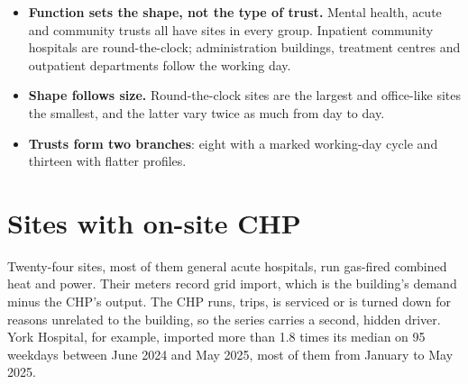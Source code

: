 \documentclass[10pt,a4paper]{article}
\newcommand{\tablefont}{\small\renewcommand{\arraystretch}{1.08}}
\newenvironment{figblock}{\par\medskip\noindent\begin{minipage}{\textwidth}}{\end{minipage}\par\medskip}
\begin{document}
\begin{itemize}
\item \textbf{Function sets the shape, not the type of trust.} Mental health, acute and community trusts all have sites in every group. Inpatient community hospitals are round-the-clock; administration buildings, treatment centres and outpatient departments follow the working day.
\item \textbf{Shape follows size.} Round-the-clock sites are the largest and office-like sites the smallest, and the latter vary twice as much from day to day.
\item \textbf{Trusts form two branches}: eight with a marked working-day cycle and thirteen with flatter profiles.
\end{itemize}

\section{Sites with on-site CHP}
Twenty-four sites, most of them general acute hospitals, run gas-fired combined heat and power. Their meters record grid import, which is the building's demand minus the CHP's output. The CHP runs, trips, is serviced or is turned down for reasons unrelated to the building, so the series carries a second, hidden driver. York Hospital, for example, imported more than 1.8 times its median on 95 weekdays between June 2024 and May 2025, most of them from January to May 2025.

\begin{figblock}\centering\tablefont
\resizebox{\textwidth}{!}{}
\end{figblock}
\end{document}
